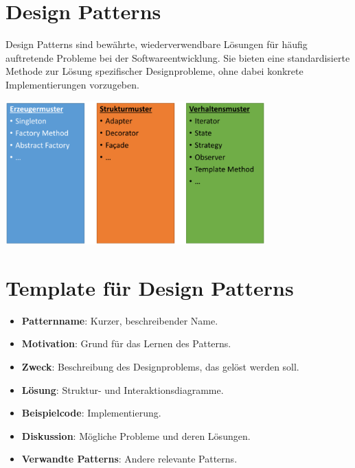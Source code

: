 \documentclass[11pt, a4paper]{article}
\begin{document}
\newpage

\section{Design Patterns} %

Design Patterns sind bewährte, wiederverwendbare Lösungen für häufig auftretende Probleme bei der Softwareentwicklung. Sie bieten eine standardisierte Methode zur Lösung spezifischer Designprobleme, ohne dabei konkrete Implementierungen vorzugeben.

\vspace{2em}

\centering \includegraphics[width=0.75\textwidth]{Designpatterns-00.png}

\raggedright

\vspace{2em}

\section{Template für Design Patterns}
\begin{itemize}
    \item \textbf{Patternname}: Kurzer, beschreibender Name.
    \item \textbf{Motivation}: Grund für das Lernen des Patterns.
    \item \textbf{Zweck}: Beschreibung des Designproblems, das gelöst werden soll.
    \item \textbf{Lösung}: Struktur- und Interaktionsdiagramme.
    \item \textbf{Beispielcode}: Implementierung.
    \item \textbf{Diskussion}: Mögliche Probleme und deren Lösungen.
    \item \textbf{Verwandte Patterns}: Andere relevante Patterns.
\end{itemize}
\end{document}

